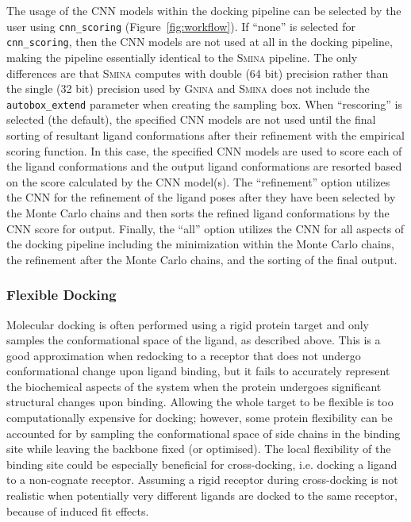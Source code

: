 \documentclass[linenumbers,doublespacing]{bmcart}
\begin{document}
The usage of the CNN models within the docking pipeline can be selected by the user using \texttt{cnn\_scoring} (Figure~\ref{fig:workflow}). If ``none'' is selected for \texttt{cnn\_scoring}, then the CNN models are not used at all in the docking pipeline, making the pipeline essentially identical to the \textsc{Smina} pipeline. The only differences are that \textsc{Smina} computes with double (64 bit) precision rather than the single (32 bit) precision used by \textsc{Gnina} and \textsc{Smina} does not include the \texttt{autobox\_extend} parameter when creating the sampling box. When ``rescoring'' is selected (the default), the specified CNN models are not used until the final sorting of resultant ligand conformations after their refinement with the empirical scoring function. In this case, the specified CNN models are used to score each of the ligand conformations and the output ligand conformations are resorted based on the score calculated by the CNN model(s). The ``refinement'' option utilizes the CNN for the refinement of the ligand poses after they have been selected by the Monte Carlo chains and then sorts the refined ligand conformations by the CNN score for output. Finally, the ``all'' option utilizes the CNN for all aspects of the docking pipeline including the minimization within the Monte Carlo chains, the refinement after the Monte Carlo chains, and the sorting of the final output. 

\subsubsection{Flexible Docking}

Molecular docking is often performed using a rigid protein target and only samples the conformational space of the ligand, as described above. This is a good approximation when redocking to a receptor that does not undergo conformational change upon ligand binding, but it fails to accurately represent the biochemical aspects of the system when the protein undergoes significant structural changes upon binding\cite{Teague2003}. Allowing the whole target to be flexible is too computationally expensive for docking; however, some protein flexibility can be accounted for by sampling the conformational space of side chains in the binding site\cite{FernandezRecio2003,Sherman2006,Zhao2008} while leaving the backbone fixed (or optimised). The local flexibility of the binding site could be especially beneficial for cross-docking, i.e. docking a ligand to a non-cognate receptor. Assuming a rigid receptor during cross-docking is not realistic when potentially very different ligands are docked to the same receptor, because of induced fit effects.\cite{Sherman2006}
\end{document}
